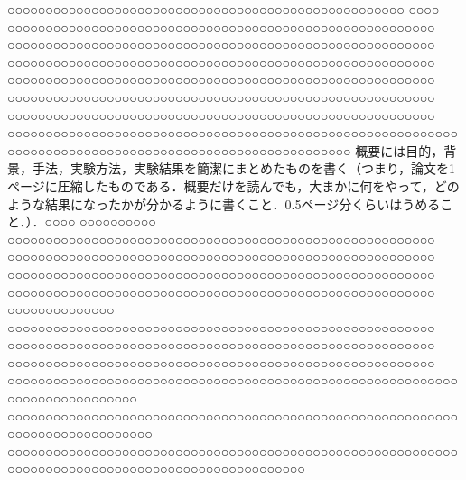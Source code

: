  ○○○○○○○○○○○○○○○○○○○○○○○○○○○○○○○○○○○○○○○○○○○○○○○○○○○○ ○○○○ ○○○○○○○○○○○○○○○○○○○○○○○○○○○○○○○○○○○○○○○○○○○○○○○○○○○○○○○○ ○○○○○○○○○○○○○○○○○○○○○○○○○○○○○○○○○○○○○○○○○○○○○○○○○○○○○○○○ ○○○○○○○○○○○○○○○○○○○○○○○○○○○○○○○○○○○○○○○○○○○○○○○○○○○○○○○○ ○○○○○○○○○○○○○○○○○○○○○○○○○○○○○○○○○○○○○○○○○○○○○○○○○○○○○○○○ ○○○○○○○○○○○○○○○○○○○○○○○○○○○○○○○○○○○○○○○○○○○○○○○○○○○○○○○○ ○○○○○○○○○○○○○○○○○○○○○○○○○○○○○○○○○○○○○○○○○○○○○○○○○○○○○○○○ ○○○○○○○○○○○○○○○○○○○○○○○○○○○○○○○○○○○○○○○○○○○○○○○○○○○○○○○○○○○○○○○○○○○○○○○○○○○○○○○○○○○○○○○○○○○○○○○○○○○○○○○○
概要には目的，背景，手法，実験方法，実験結果を簡潔にまとめたものを書く（つまり，論文を1ページに圧縮したものである．概要だけを読んでも，大まかに何をやって，どのような結果になったかが分かるように書くこと．0.5ページ分くらいはうめること．）．○○○○ ○○○○○○○○○○ ○○○○○○○○○○○○○○○○○○○○○○○○○○○○○○○○○○○○○○○○○○○○○○○○○○○○○○○○ ○○○○○○○○○○○○○○○○○○○○○○○○○○○○○○○○○○○○○○○○○○○○○○○○○○○○○○○○ ○○○○○○○○○○○○○○○○○○○○○○○○○○○○○○○○○○○○○○○○○○○○○○○○○○○○○○○○ ○○○○○○○○○○○○○○○○○○○○○○○○○○○○○○○○○○○○○○○○○○○○○○○○○○○○○○○○ ○○○○○○○○○○○○○○ ○○○○○○○○○○○○○○○○○○○○○○○○○○○○○○○○○○○○○○○○○○○○○○○○○○○○○○○○ ○○○○○○○○○○○○○○○○○○○○○○○○○○○○○○○○○○○○○○○○○○○○○○○○○○○○○○○○ ○○○○○○○○○○○○○○○○○○○○○○○○○○○○○○○○○○○○○○○○○○○○○○○○○○○○○○○○ ○○○○○○○○○○○○○○○○○○○○○○○○○○○○○○○○○○○○○○○○○○○○○○○○○○○○○○○○○○○○○○○○○○○○○○○○○○○○ ○○○○○○○○○○○○○○○○○○○○○○○○○○○○○○○○○○○○○○○○○○○○○○○○○○○○○○○○○○○○○○○○○○○○○○○○○○○○○○ ○○○○○○○○○○○○○○○○○○○○○○○○○○○○○○○○○○○○○○○○○○○○○○○○○○○○○○○○○○○○○○○○○○○○○○○○○○○○○○○○○○○○○○○○○○○○○○○○○○

\clearpage
